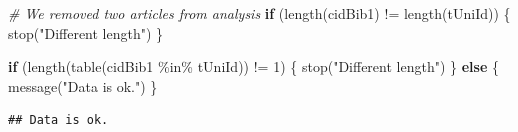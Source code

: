 \documentclass[
]{article}
\newenvironment{Shaded}{\begin{snugshade}}{\end{snugshade}}
\newcommand{\CommentTok}[1]{\textcolor[rgb]{0.56,0.35,0.01}{\textit{#1}}}
\newcommand{\ControlFlowTok}[1]{\textcolor[rgb]{0.13,0.29,0.53}{\textbf{#1}}}
\newcommand{\DecValTok}[1]{\textcolor[rgb]{0.00,0.00,0.81}{#1}}
\newcommand{\FunctionTok}[1]{\textcolor[rgb]{0.00,0.00,0.00}{#1}}
\newcommand{\NormalTok}[1]{#1}
\newcommand{\SpecialCharTok}[1]{\textcolor[rgb]{0.00,0.00,0.00}{#1}}
\newcommand{\StringTok}[1]{\textcolor[rgb]{0.31,0.60,0.02}{#1}}
\begin{document}
\begin{Shaded}
\begin{Highlighting}[]
\CommentTok{\# We removed two articles from analysis}
\ControlFlowTok{if}\NormalTok{ (}\FunctionTok{length}\NormalTok{(cidBib1) }\SpecialCharTok{!=} \FunctionTok{length}\NormalTok{(tUniId)) \{}
  \FunctionTok{stop}\NormalTok{(}\StringTok{"Different length"}\NormalTok{)}
\NormalTok{\}}

\ControlFlowTok{if}\NormalTok{ (}\FunctionTok{length}\NormalTok{(}\FunctionTok{table}\NormalTok{(cidBib1 }\SpecialCharTok{\%in\%}\NormalTok{ tUniId)) }\SpecialCharTok{!=} \DecValTok{1}\NormalTok{) \{}
  \FunctionTok{stop}\NormalTok{(}\StringTok{"Different length"}\NormalTok{)}
\NormalTok{\} }\ControlFlowTok{else}\NormalTok{ \{}
  \FunctionTok{message}\NormalTok{(}\StringTok{"Data is ok."}\NormalTok{)}
\NormalTok{\}}
\end{Highlighting}
\end{Shaded}

\begin{verbatim}
## Data is ok.
\end{verbatim}
\end{document}
